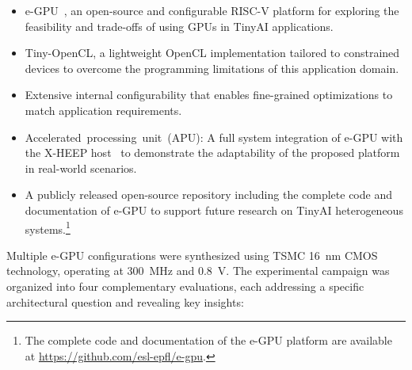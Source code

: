             \vspace{-1em}
            \begin{itemize}
                \item \mbox{e-GPU}~\cite{e-gpu}, an open-source and configurable RISC-V platform for exploring the feasibility and trade-offs of using GPUs in TinyAI applications.

                \item \mbox{Tiny-OpenCL}, a lightweight OpenCL implementation tailored to constrained devices to overcome the programming limitations of this application domain.
        
                \item Extensive internal configurability that enables fine-grained optimizations to match application requirements.

                \item \mbox{Accelerated processing unit (APU)}: A full system integration of e-GPU with the \mbox{X-HEEP} host~\cite{x-heep} to demonstrate the adaptability of the proposed platform in real-world scenarios.
        
                \item A publicly released open-source repository including the complete code and documentation of \mbox{e-GPU} to support future research on TinyAI heterogeneous systems.\footnote{The complete code and documentation of the e-GPU platform are available at \url{https://github.com/esl-epfl/e-gpu}.}
            \end{itemize}
            \vspace{-1em}

            Multiple \mbox{e-GPU} configurations were synthesized using TSMC \SI{16}{\nano\meter} CMOS technology, operating at \SI{300}{\mega\hertz} and \SI{0.8}{\volt}. The experimental campaign was organized into four complementary evaluations, each addressing a specific architectural question and revealing key insights:

